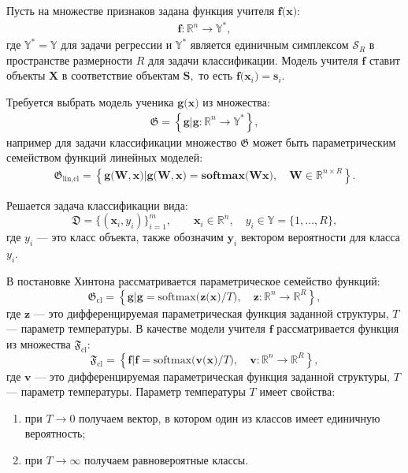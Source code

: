\documentclass{dissert}
\begin{document}
Пусть на множестве признаков задана функция учителя $\mathbf{f}\bigr(\mathbf{x}\bigr)$:
\[
\begin{aligned}
\mathbf{f}:\mathbb{R}^{n} \to \mathbb{Y}^*,
\end{aligned}
\]
где $\mathbb{Y}^*=\mathbb{Y}$ для задачи регрессии и $\mathbb{Y}^*$ является единичным симплексом $\mathcal{S}_R$ в пространстве размерности $R$ для задачи классификации. Модель учителя $\mathbf{f}$ ставит объекты $\mathbf{X}$ в соответствие объектам $\mathbf{S},$ то есть  $\mathbf{f}\bigr(\mathbf{x}_i\bigr)=\mathbf{s}_i$.

Требуется выбрать модель ученика $\mathbf{g}\bigr(\mathbf{x}\bigr)$ из множества:
\[
\label{eq:st:G}
\begin{aligned}
\mathfrak{G} = \left\{\mathbf{g}| \mathbf{g}:\mathbb{R}^{n} \to \mathbb{Y}^*\right\},
\end{aligned}
\]
например для задачи классификации множество $\mathfrak{G}$ может быть параметрическим семейством функций линейных моделей:
\[
\label{eq:st:G:lin:cl}
\begin{aligned}
\mathfrak{G}_\text{lin,cl} = \left\{\mathbf{g}\bigr(\mathbf{W}, \mathbf{x}\bigr)| \mathbf{g}\bigr(\mathbf{W}, \mathbf{x}\bigr) = \textbf{softmax}\bigr(\mathbf{W}\mathbf{x}\bigr), \quad \mathbf{W} \in \mathbb{R}^{n\times R}\right\}.
\end{aligned}
\]

Решается задача классификации вида:
\[
    \mathfrak{D} = \{\left(\mathbf{x}_i, y_i\right)\}_{i=1}^{m}, \qquad \mathbf{x}_i \in \mathbb{R}^{n}, \quad y_i \in \mathbb{Y}=\{1, \ldots, R\},
\]
где $y_i$ --- это класс объекта, также обозначим $\mathbf{y}_i$ вектором вероятности для класса $y_i$.

В постановке Хинтона рассматривается параметрическое семейство функций:
\[
\label{eq:G:set:cl}
\mathfrak{G}_{\text{cl}} = \left\{\mathbf{g}| \mathbf{g} = \text{softmax}\bigr(\mathbf{z}\bigr(\mathbf{x}\bigr)/T\bigr), \quad \mathbf{z}: \mathbb{R}^n \to \mathbb{R}^R \right\},
\]
где $\mathbf{z}$ --- это дифференцируемая параметрическая функция заданной структуры, $T$ --- параметр температуры. В качестве модели учителя $\mathbf{f}$ рассматривается функция из множества $\mathfrak{F}_{\text{cl}}$:
\[
\label{eq:F:set:cl}
\mathfrak{F}_{\text{cl}} = \left\{\mathbf{f}| \mathbf{f} = \text{softmax}\bigr(\mathbf{v}\bigr(\mathbf{x}\bigr)/T\bigr), \quad \mathbf{v}: \mathbb{R}^n \to \mathbb{R}^R \right\},
\]
где $\mathbf{v}$ --- это дифференцируемая параметрическая функция заданной структуры, $T$ --- параметр температуры.
Параметр температуры $T$ имеет свойства:
\begin{enumerate}
    \item при $T\to 0$ получаем вектор, в котором один из классов имеет единичную вероятность;
    \item при $T\to \infty$ получаем равновероятные классы.
\end{enumerate}
\end{document}
